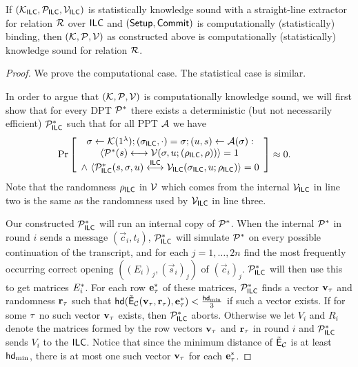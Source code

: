   
      \begin{theorem}\label{thm:sound}
    If $(\mathcal{K}_{\mathsf{ILC}},\mathcal{P}_{\mathsf{ILC}},\mathcal{V}_{\mathsf{ILC}})$ is statistically knowledge sound with a straight-line extractor for relation $\mathcal{R}$ over $\mathsf{ILC}$ and $(\mathsf{Setup},\mathsf{Commit})$ is computationally (statistically) binding, then $(\mathcal{K},\mathcal{P},\mathcal{V})$ as constructed above is computationally (statistically) knowledge sound for relation $\mathcal{R}$.
    \end{theorem}   
    \begin{proof}

We prove the computational case. The statistical case is similar.%


In order to argue that $(\mathcal{K},\mathcal{P},\mathcal{V})$ is computationally knowledge sound, we will first show that for every DPT $\mathcal{P}^*$ there exists a deterministic (but not necessarily efficient) $\mathcal{P}_{\mathsf{ILC}}^*$ such that for all PPT $\mathcal{A}$ we have 
\begin{align}\Pr&\left[\begin{array}{c} \mathsf{\sigma}\gets \mathcal{K}(1^{\lambda});(\mathsf{\sigma}_{\mathsf{ILC}},\cdot)=\mathsf{\sigma};(u,s) \gets \mathcal{A}(\mathsf{\sigma}):\\
\langle \mathcal{P}^*(s)\longleftrightarrow\mathcal{V}(\mathsf{\sigma},u;(\rho_{\mathsf{ILC}},\rho))\rangle = 1 \, \\
\wedge~~\langle \mathcal{P}_{\mathsf{ILC}}^*(s,\mathsf{\sigma},u)\overset{\mathsf{ILC}}{\longleftrightarrow}\mathcal{V}_{\mathsf{ILC}}(\mathsf{\sigma}_{\mathsf{ILC}},u;\rho_{\mathsf{ILC}})\rangle = 0
\end{array}
\right]\approx 0.\label{zkip:ineq:pilcstar}
\end{align}
Note that the randomness $\rho_{\mathsf{ILC}}$ in $\mathcal{V}$ which comes from the internal $\mathcal{V}_{\mathsf{ILC}}$ in line two is the same as the randomness used by $\mathcal{V}_{\mathsf{ILC}}$ in line three. 

Our constructed $\mathcal{P}_{\mathsf{ILC}}^*$ will run an internal copy of $\mathcal{P}^*$.
When the internal $\mathcal{P}^*$ in round $i$ sends a message $(\vec{c}_i,t_i)$, $\mathcal{P}_{\mathsf{ILC}}^*$ will simulate $\mathcal{P}^*$ on every possible continuation of the transcript, and for each $j=1,\ldots,2n$ find the most frequently occurring correct opening $((E_i)_j,(\vec{s}_i)_j)$ of $(\vec{c}_i)_j$. $\mathcal{P}_{\mathsf{ILC}}^*$ will then use this to get matrices $E^*_i$. For each row $\mathbf{e}^*_\tau$ of these matrices, $\mathcal{P}_{\mathsf{ILC}}^*$ finds a vector ${\mathbf{v}}_{\tau}$ and randomness $\mathbf{r}_\tau$ such that $\mathsf{hd}(\tilde{\mathsf{E}}_{\mathcal{C}}({\mathbf{v}}_\tau,\mathbf{r}_\tau),\mathbf{e}^*_\tau)<\frac{\mathsf{hd}_{\mathrm{min}}}{3}$ if such a vector exists.
If for some $\tau$ no such vector ${\mathbf{v}}_\tau$ exists, then $\mathcal{P}_{\mathsf{ILC}}^*$ aborts. Otherwise we let $V_i$ and $R_i$ denote the matrices formed by the row vectors $\mathbf{v}_\tau$ and $\mathbf{r}_\tau$ in round $i$ and $\mathcal{P}_{\mathsf{ILC}}^*$ sends $V_i$ to the $\mathsf{ILC}$.
Notice that since the minimum distance of $\tilde{\mathsf{E}}_{\mathcal{C}}$ is at least $\mathsf{hd}_{\mathrm{min}}$, there is at most one such vector ${\mathbf{v}}_\tau$ for each $\mathbf{e}^*_\tau$. 


\end{proof}
